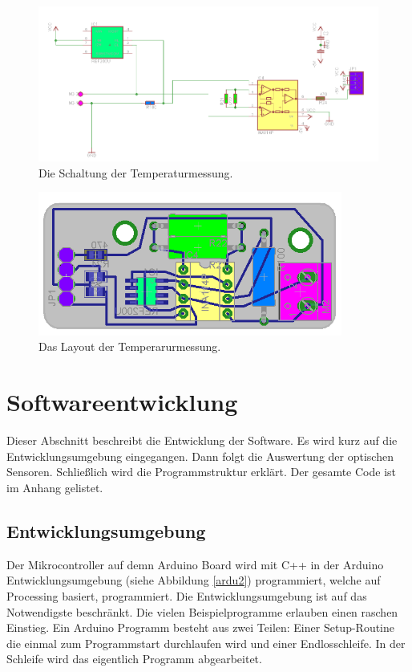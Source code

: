 \documentclass[a4paper,bibtotoc,oneside]{scrbook}
\begin{document}
\begin{figure}[htbp]
\centering
\includegraphics[width=125mm]{img/tmess.png}
\caption{Die Schaltung der Temperaturmessung.}\label{tmess}
\end{figure}

\begin{figure}[htbp]
\centering
\includegraphics[width=100mm]{img/tmess2.png}
\caption{Das Layout der Temperarurmessung.}\label{tmess2}
\end{figure}






\section{Softwareentwicklung}\thispagestyle{empty}
Dieser Abschnitt beschreibt die Entwicklung der Software. Es wird kurz auf die Entwicklungsumgebung eingegangen. Dann folgt die Auswertung der optischen Sensoren. Schließlich wird die Programmstruktur erklärt. Der gesamte Code ist im Anhang gelistet.

\subsection{Entwicklungsumgebung}\thispagestyle{empty}
Der Mikrocontroller auf demn Arduino Board wird mit C++ in der Arduino Entwicklungsumgebung (siehe Abbildung \ref{ardu2}) programmiert, welche auf Processing basiert, programmiert. Die Entwicklungsumgebung ist auf das Notwendigste beschränkt. Die vielen Beispielprogramme erlauben einen raschen Einstieg.
Ein Arduino Programm besteht aus zwei Teilen: Einer Setup-Routine die einmal zum Programmstart durchlaufen wird und einer Endlosschleife. In der Schleife wird das eigentlich Programm abgearbeitet. 
\end{document}
